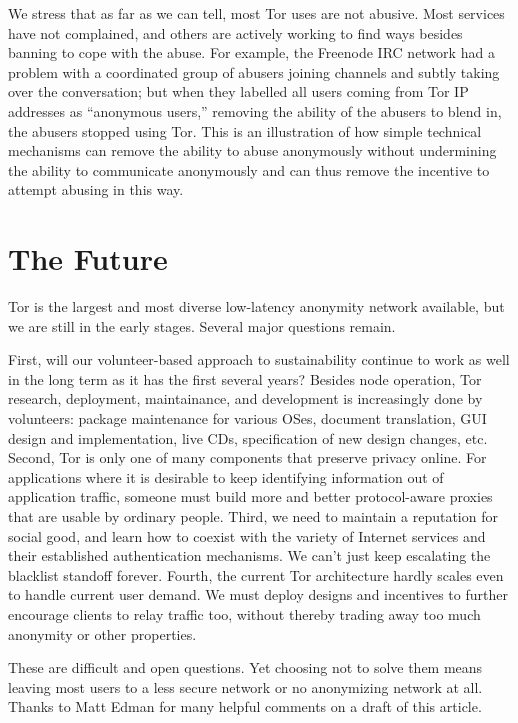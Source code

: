 \documentclass{llncs}
\begin{document}
We stress that as far as we can tell, most Tor uses are not
abusive. Most services have not complained, and others are actively
working to find ways besides banning to cope with the abuse. For
example, the Freenode IRC network had a problem with a coordinated
group of abusers joining channels and subtly taking over the
conversation; but when they labelled all users coming from Tor IP
addresses as ``anonymous users,'' removing the ability of the abusers
to blend in, the abusers stopped using Tor.  This is an illustration of
how simple
technical mechanisms can remove the ability to abuse anonymously
without undermining the ability to communicate anonymously and can
thus remove the incentive to attempt abusing in this way.



\section{The Future}
\label{sec:conclusion}

Tor is the largest and most diverse low-latency anonymity network
available, but we are still in the early stages. Several major
questions remain.

First, will our volunteer-based approach to sustainability continue to
work as well in the long term as it has the first several years?
Besides node operation, Tor research, deployment, maintainance, and
development is increasingly done by volunteers: package maintenance
for various OSes, document translation, GUI design and implementation,
live CDs, specification of new design changes, etc.\
%
Second, Tor is only one of many components that preserve privacy
online.  For applications where it is desirable to keep identifying
information out of application traffic, someone must build more and
better protocol-aware proxies that are usable by ordinary people.
%
Third, we need to maintain a reputation for social good, and learn how to
coexist with the variety of Internet services and their established
authentication mechanisms. We can't just keep escalating the blacklist
standoff forever.
%
Fourth, the current Tor architecture hardly scales even to handle
current user demand. We must deploy designs and incentives to further
encourage clients to relay traffic too, without thereby trading away
too much anonymity or other properties.

These are difficult and open questions. Yet choosing not to solve them
means leaving most users to a less secure network or no anonymizing
network at all.\\

 Thanks to Matt Edman for many
  helpful comments on a draft of this article.
 
\end{document}
